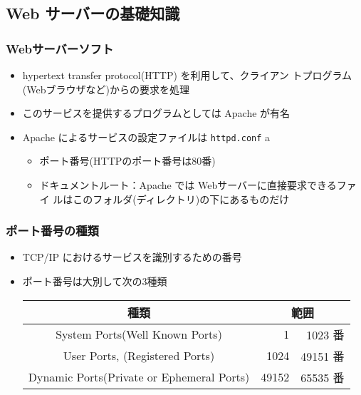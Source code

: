 \subsection{Web サーバーの基礎知識}
\begin{frame}[containsverbatim]
\frametitle{Webサーバーソフト}
\begin{itemize}
 \item hypertext transfer protocol(HTTP) を利用して、クライアン
トプログラム(Webブラウザなど)からの要求を処理
 \item このサービスを提供するプログラムとしては Apache が有名
 \item Apache によるサービスの設定ファイルは
       {\texttt{httpd.conf}}
a\begin{itemize}
 \item ポート番号(HTTPのポート番号は80番)
 \item ドキュメントルート：Apache では Webサーバーに直接要求できるファイ
       ルはこのフォルダ(ディレクトリ)の下にあるものだけ
\end{itemize}
\end{itemize}
\end{frame}
\begin{frame}[containsverbatim]
\frametitle{ポート番号の種類}
\begin{itemize}
 \item TCP/IP におけるサービスを識別するための番号
 \item ポート番号は大別して次の3種類
\begin{center}
 \begin{tabular}{|c|r@{番$\sim$}r<{番}|%
}
\hline
種類 &\multicolumn{2}{c|}{範囲}%
 \\\hline
  System Ports(Well Known Ports)& 1&1023 %
\\ \hline
  User Ports, (Registered Ports)& 1024&49151 %
\\  \hline
  Dynamic Ports(Private or Ephemeral Ports)& 49152& 65535%
 \\ \hline
 \end{tabular}
\end{center}
\end{itemize}
\end{frame}
